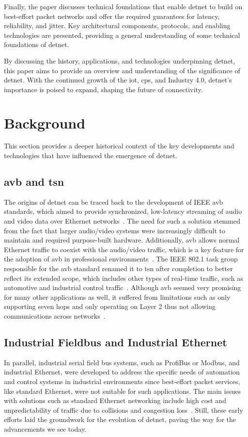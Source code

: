 \documentclass[runningheads]{llncs}
\begin{document}
Finally, the paper discusses technical foundations that enable \gls{detnet} to build on best-effort packet networks and offer the required guarantees for latency, reliability, and jitter. Key architectural components, protocols, and enabling technologies are presented, providing a general understanding of some technical foundations of \gls{detnet}.

By discussing the history, applications, and technologies underpinning \gls{detnet}, this paper aims to provide an overview and understanding of the significance of \gls{detnet}. With the continued growth of the \gls{iot}, \gls{cps}, and Industry 4.0, \gls{detnet}'s importance is poised to expand, shaping the future of connectivity.

\section{Background}

This section provides a deeper historical context of the key developments and technologies that have influenced the emergence of \gls{detnet}.

\subsection*{\gls{avb} and \gls{tsn}}
The origins of \gls{detnet} can be traced back to the development of IEEE \gls{avb} standards, which aimed to provide synchronized, low-latency streaming of audio and video data over Ethernet networks~\cite{Yang2019}. The need for such a solution stemmed from the fact that larger audio/video systems were increasingly difficult to maintain and required purpose-built hardware. Additionally, \gls{avb} allows normal Ethernet traffic to coexist with the audio/video traffic, which is a key feature for the adoption of \gls{avb} in professional environments~\cite{Lim2012}. The IEEE 802.1 task group responsible for the \gls{avb} standard renamed it to \gls{tsn} after completion to better reflect its extended scope, which includes other types of real-time traffic, such as automotive and industrial control traffic~\cite{Wollschlaeger2017}. Although \gls{avb} seemed very promising for many other applications as well, it suffered from limitations such as only supporting seven hops and only operating on Layer 2 thus not allowing communications across networks~\cite{Imtiaz2009}.

\subsection*{Industrial Fieldbus and Industrial Ethernet}
In parallel, industrial serial field bus systems, such as ProfiBus or Modbus, and industrial Ethernet, were developed to address the specific needs of automation and control systems in industrial environments since best-effort packet services, like standard Ethernet, were not suitable for such applications. The main issues with solutions such as standard Ethernet networking include high cost and unpredictability of traffic due to collisions and congestion loss~\cite{Finn2018}. Still, these early efforts laid the groundwork for the evolution of \gls{detnet}, paving the way for the advancements we see today. 
\end{document}
